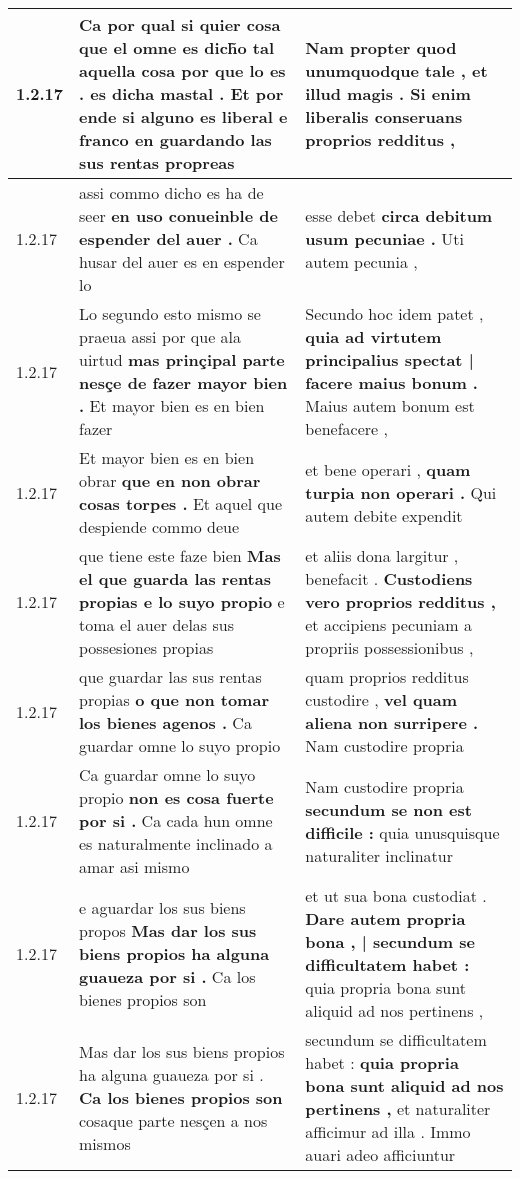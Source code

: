 \begin{tabular}{|p{1cm}|p{6.5cm}|p{6.5cm}|}
1.2.17 & Ca por qual si quier cosa que el omne es dich̃o tal aquella cosa \textbf{ por que lo es . es dicha mastal . } Et por ende si alguno es liberal e franco en guardando las sus rentas propreas & Nam propter quod unumquodque tale , \textbf{ et illud magis . } Si enim liberalis conseruans proprios redditus , \\\hline
1.2.17 & assi commo dicho es ha de seer \textbf{ en uso conueinble de espender del auer . } Ca husar del auer es en espender lo & esse debet \textbf{ circa debitum usum pecuniae . } Uti autem pecunia , \\\hline
1.2.17 & Lo segundo esto mismo se praeua assi por que ala uirtud \textbf{ mas prinçipal parte nesçe de fazer mayor bien . } Et mayor bien es en bien fazer & Secundo hoc idem patet , \textbf{ quia ad virtutem principalius spectat | facere maius bonum . } Maius autem bonum est benefacere , \\\hline
1.2.17 & Et mayor bien es en bien obrar \textbf{ que en non obrar cosas torpes . } Et aquel que despiende commo deue & et bene operari , \textbf{ quam turpia non operari . } Qui autem debite expendit \\\hline
1.2.17 & que tiene este faze bien \textbf{ Mas el que guarda las rentas propias e lo suyo propio } e toma el auer delas sus possesiones propias & et aliis dona largitur , benefacit . \textbf{ Custodiens vero proprios redditus , } et accipiens pecuniam a propriis possessionibus , \\\hline
1.2.17 & que guardar las sus rentas propias \textbf{ o que non tomar los bienes agenos . } Ca guardar omne lo suyo propio & quam proprios redditus custodire , \textbf{ vel quam aliena non surripere . } Nam custodire propria \\\hline
1.2.17 & Ca guardar omne lo suyo propio \textbf{ non es cosa fuerte por si . } Ca cada hun omne es naturalmente inclinado a amar asi mismo & Nam custodire propria \textbf{ secundum se non est difficile : } quia unusquisque naturaliter inclinatur \\\hline
1.2.17 & e aguardar los sus biens propos \textbf{ Mas dar los sus biens propios ha alguna guaueza por si . } Ca los bienes propios son & et ut sua bona custodiat . \textbf{ Dare autem propria bona , | secundum se difficultatem habet : } quia propria bona sunt aliquid ad nos pertinens , \\\hline
1.2.17 & Mas dar los sus biens propios ha alguna guaueza por si . \textbf{ Ca los bienes propios son } cosaque parte nesçen a nos mismos & secundum se difficultatem habet : \textbf{ quia propria bona sunt aliquid ad nos pertinens , } et naturaliter afficimur ad illa . Immo auari adeo afficiuntur \\\hline

\end{tabular}
